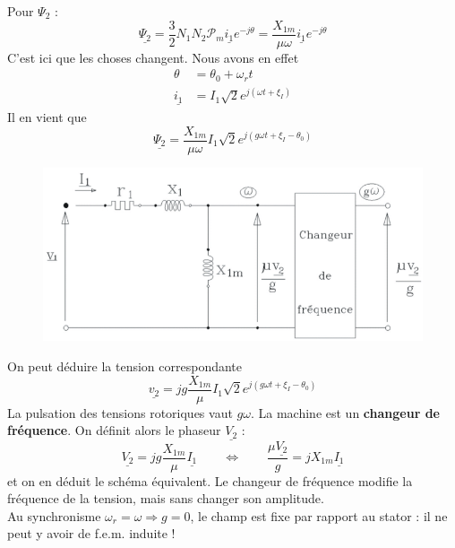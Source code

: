 		Pour $\Psi_2$ :
		\begin{equation}
		\underline{\Psi_2} = \frac{3}{2}N_1N_2\mathcal{P}_m\underline{i_1}e^{-j\theta} 
		= \dfrac{X_{1m}}{\mu\omega}\underline{i_1}e^{-j\theta}
		\end{equation}
		C'est ici que les choses changent. Nous avons en effet
		\begin{equation}
		\begin{array}{ll}
		\theta &= \theta_0 + \omega_rt\\
		\underline{i_1} &= I_1\sqrt{2}e^{j(\omega t+\xi_I)}
		\end{array}
		\end{equation}
		Il en vient que
		\begin{equation}
		\underline{\Psi_2} = \dfrac{X_{1m}}{\mu\omega}I_1\sqrt{2}e^{j(g\omega t+\xi_I
		-\theta_0)}
		\end{equation}
							\begin{figure}
	\vspace{-8mm}
	\includegraphics[scale=0.35]{ch5/image22.png}
	\end{figure}
		On peut déduire la tension correspondante 
		\begin{equation}
		\underline{v_2} = jg\dfrac{X_{1m}}{\mu}I_1\sqrt{2}e^{j(g\omega t + \xi_I-\theta_0)}
		\end{equation}
		La pulsation des tensions rotoriques vaut $g\omega$. La machine est un \textbf{
		changeur de fréquence}. On définit alors le phaseur $\underline{V_2}$  :\\
		
		\begin{equation}
		\underline{V_2} = jg\dfrac{X_{1m}}{\mu}\underline{I_1}\qquad\Leftrightarrow\qquad 
		\dfrac{\mu\underline{V_2}}{g} = jX_{1m}\underline{I_1}
		\end{equation}
		et on en déduit le schéma équivalent. Le changeur de fréquence modifie la fréquence 
		de la tension, mais sans changer son amplitude.\\
		\danger Au synchronisme $\omega_r=\omega \Rightarrow g=0$, le champ est fixe par 
		rapport au stator : il ne peut y avoir de f.e.m. induite !
		
